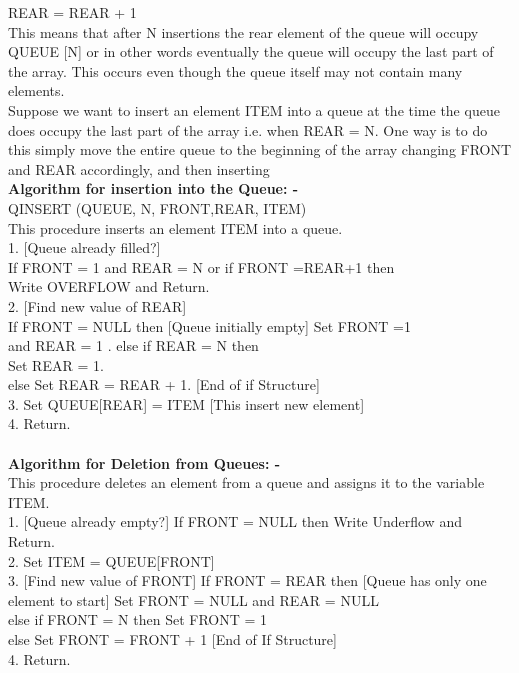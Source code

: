 \documentclass[11pt]{article}            %
\begin{document}
REAR = REAR + 1  \\
This means that after N insertions the rear element of the queue will occupy QUEUE [N] or in other words eventually the queue will occupy the last part of the array. This occurs even though the queue itself may not contain many elements.\\  
Suppose we want to insert an element ITEM into a queue at the time the queue does occupy the last part of the array i.e. when REAR = N. One way is to do this simply move the entire queue to the beginning of the array changing FRONT and REAR accordingly, and then inserting  \\


\textbf{Algorithm for insertion into the Queue: -  }\\
QINSERT (QUEUE, N, FRONT,REAR, ITEM)\\
 This procedure inserts an element ITEM into a queue.  \\
1. [Queue already filled?] \\
If FRONT = 1 and REAR = N or if FRONT =REAR+1 then\\
 Write OVERFLOW and Return.\\
 2. [Find new value of REAR]\\
 If FRONT = NULL then [Queue initially empty] Set FRONT =1\\
 and REAR = 1
. else if REAR = N then\\
 Set REAR = 1.  \\
else Set REAR = REAR + 1. [End of if Structure]\\
 3. Set QUEUE[REAR] = ITEM [This insert new element]\\
 4. Return.  \\ \\


\textbf{Algorithm for Deletion from Queues: - }\\
This procedure deletes an element from a queue and assigns it to the variable ITEM.  \\
1. [Queue already empty?] If FRONT = NULL then Write Underflow and Return.\\
 2. Set ITEM = QUEUE[FRONT] \\
3. [Find new value of FRONT] If FRONT = REAR then [Queue has only one element to start] Set FRONT = NULL and REAR = NULL\\
 else if FRONT = N then Set FRONT = 1\\
 else Set FRONT = FRONT + 1 [End of If Structure]\\
 4. Return. \\ \\  
\end{document}
